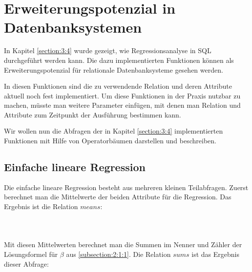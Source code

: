 \chapter{Erweiterungspotenzial in Datenbanksystemen}
\label{chapter:5}

In Kapitel \ref{section:3:4} wurde gezeigt, wie Regressionsanalyse in SQL durchgeführt werden kann. Die dazu implementierten Funktionen können als Erweiterungspotenzial für relationale Datenbanksysteme gesehen werden.

In diesen Funktionen sind die zu verwendende Relation und deren Attribute aktuell noch fest implementiert. Um diese Funktionen in der Praxis nutzbar zu machen, müsste man weitere Parameter einfügen, mit denen man Relation und Attribute zum Zeitpunkt der Ausführung bestimmen kann.

Wir wollen nun die Abfragen der in Kapitel \ref{section:3:4} implementierten Funktionen mit Hilfe von Operatorbäumen darstellen und beschreiben.

\section{Einfache lineare Regression}
\label{section:5:1}

Die einfache lineare Regression besteht aus mehreren kleinen Teilabfragen. Zuerst berechnet man die Mittelwerte der beiden Attribute für die Regression. Das Ergebnis ist die Relation $means$:
\\\\
\noindent{}
\\\\
Mit diesen Mittelwerten berechnet man die Summen im Nenner und Zähler der Lösungsformel für $\beta$ aus \ref{subsection:2:1:1}. Die Relation $sums$ ist das Ergebnis dieser Abfrage:
\\\\
\noindent{}
\\\\

